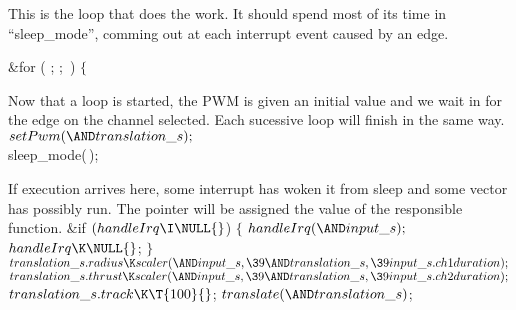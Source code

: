 This is the loop that does the work.
It should spend most of its time in ``sleep\_mode'', comming out at each
interrupt event caused by an edge.

\Y\B\&{for} ( ;  ; \,) $\{{}$\Y\par
\fi

Now that a loop is started, the PWM is given an initial value and we wait in
 for the edge on the channel selected. Each sucessive loop will
finish
in the same way.
\Y\B$\\{setPwm}({\AND}\\{translation\_s});{}$\6
\\{sleep\_mode}(\,);\par
\fi

If execution arrives here, some interrupt has woken it from sleep and some
vector has possibly run.
The pointer  will be assigned the value of the responsible
function.
\Y\B\&{if} ${}(\\{handleIrq}\I\NULL{}$)\6
${}\{{}$\1\7
${}\\{handleIrq}({\AND}\\{input\_s});{}$\6
${}\\{handleIrq}\K\NULL{}$;\6
\4${}\}{}$\2\6
${}\\{translation\_s}.\\{radius}\K\\{scaler}({\AND}\\{input\_s},\39{\AND}%
\\{translation\_s},\39\\{input\_s}.\\{ch1duration});{}$\6
${}\\{translation\_s}.\\{thrust}\K\\{scaler}({\AND}\\{input\_s},\39{\AND}%
\\{translation\_s},\39\\{input\_s}.\\{ch2duration});{}$\6
${}\\{translation\_s}.\\{track}\K\T{100}{}$;\6
${}\\{translate}({\AND}\\{translation\_s}){}$;\par
\fi

